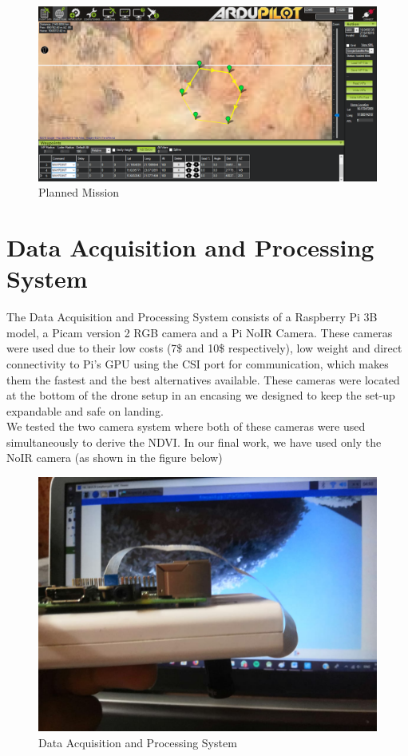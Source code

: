 \begin{figure}[H]
    \centering
    \includegraphics[width=\linewidth]{SummerInterReport/project/Images-Major/mnew.png}
    \caption{Planned Mission}
    \label{fig:compEy}
\end{figure}

\section{Data Acquisition and Processing System}
The Data Acquisition and Processing System consists of a Raspberry Pi 3B model, a Picam version 2 RGB camera and a Pi NoIR Camera. These cameras were used due to their low costs (7\$ and 10\$ respectively), low weight and direct connectivity to Pi's GPU using the CSI port for communication, which makes them the fastest and the best alternatives available. These cameras were located at the bottom of the drone setup in an encasing we designed to keep the set-up expandable and safe on landing.
\\
We tested the two camera system where both of these cameras were used simultaneously to derive the NDVI. In our final work, we have used only the NoIR camera (as shown in the figure below)
\begin{figure}[H]
    \centering
    \includegraphics[width=0.7\linewidth]{SummerInterReport/project/Images-Major/pi_system.jpeg}
    \caption{Data Acquisition and Processing System}
    \label{fig:compEy}
\end{figure}

